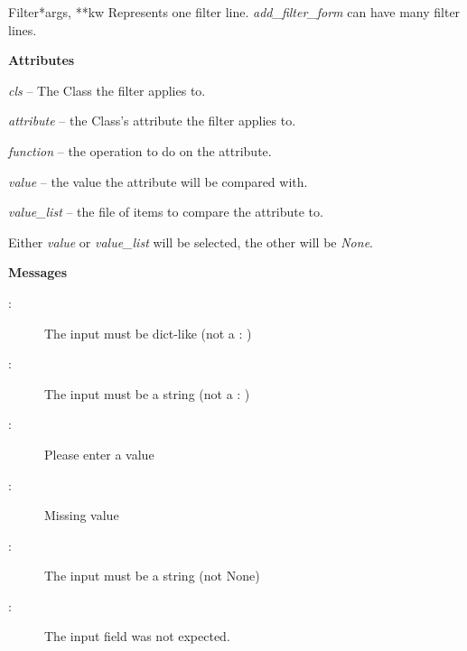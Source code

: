 \documentclass[letterpaper,10pt,english]{manual}
\begin{document}
\hypertarget{webscavator.forms.forms.Filter}{}\begin{classdesc}{Filter}{*args, **kw}
Represents one filter line. \emph{add\_filter\_form} can have many filter lines.

\textbf{Attributes}

\emph{cls} -- The Class the filter applies to.

\emph{attribute} -- the Class's attribute the filter applies to.

\emph{function} -- the operation to do on the attribute.

\emph{value} -- the value the attribute will be compared with.

\emph{value\_list} -- the file of items to compare the attribute to.

Either \emph{value} or \emph{value\_list} will be selected, the other will be \emph{None}.

\textbf{Messages}
\begin{description}
\item[:]
The input must be dict-like (not a : )

\item[:]
The input must be a string (not a : )

\item[:]
Please enter a value

\item[:]
Missing value

\item[:]
The input must be a string (not None)

\item[:]
The input field  was not expected.

\end{description}
\end{classdesc}
\end{document}
